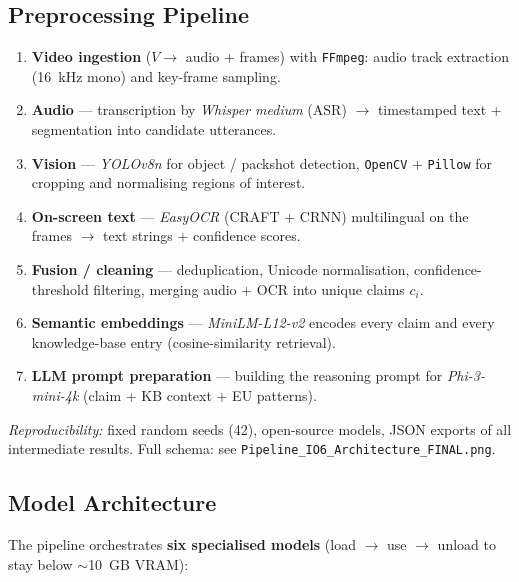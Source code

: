 \documentclass[11pt,a4paper]{article}
\begin{document}
\subsection{Preprocessing Pipeline}

\begin{enumerate}[label=\textbf{\arabic*.}, noitemsep]
  \item \textbf{Video ingestion} ($V \to$ audio + frames) with \texttt{FFmpeg}:
  audio track extraction (16~kHz mono) and key-frame sampling.
  \item \textbf{Audio} --- transcription by \emph{Whisper medium} (ASR) $\to$
  timestamped text + segmentation into candidate utterances.
  \item \textbf{Vision} --- \emph{YOLOv8n} for object / packshot detection,
  \texttt{OpenCV} + \texttt{Pillow} for cropping and normalising regions of
  interest.
  \item \textbf{On-screen text} --- \emph{EasyOCR} (CRAFT + CRNN) multilingual on
  the frames $\to$ text strings + confidence scores.
  \item \textbf{Fusion / cleaning} --- deduplication, Unicode normalisation,
  confidence-threshold filtering, merging audio + OCR into unique claims $c_i$.
  \item \textbf{Semantic embeddings} --- \emph{MiniLM-L12-v2} encodes every claim
  and every knowledge-base entry (cosine-similarity retrieval).
  \item \textbf{LLM prompt preparation} --- building the reasoning prompt for
  \emph{Phi-3-mini-4k} (claim + KB context + EU patterns).
\end{enumerate}

\noindent\textit{Reproducibility:} fixed random seeds (42), open-source models,
JSON exports of all intermediate results. Full schema: see
\texttt{Pipeline\_IO6\_Architecture\_FINAL.png}.

\subsection{Model Architecture}

The pipeline orchestrates \textbf{six specialised models} (load $\to$ use $\to$
unload to stay below $\sim$10~GB VRAM):
\end{document}
